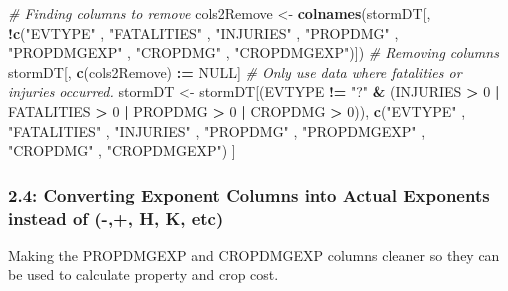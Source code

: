 \documentclass[]{article}
\newenvironment{Shaded}{\begin{snugshade}}{\end{snugshade}}
\newcommand{\KeywordTok}[1]{\textcolor[rgb]{0.13,0.29,0.53}{\textbf{#1}}}
\newcommand{\DecValTok}[1]{\textcolor[rgb]{0.00,0.00,0.81}{#1}}
\newcommand{\StringTok}[1]{\textcolor[rgb]{0.31,0.60,0.02}{#1}}
\newcommand{\CommentTok}[1]{\textcolor[rgb]{0.56,0.35,0.01}{\textit{#1}}}
\newcommand{\OtherTok}[1]{\textcolor[rgb]{0.56,0.35,0.01}{#1}}
\newcommand{\OperatorTok}[1]{\textcolor[rgb]{0.81,0.36,0.00}{\textbf{#1}}}
\newcommand{\ErrorTok}[1]{\textcolor[rgb]{0.64,0.00,0.00}{\textbf{#1}}}
\newcommand{\NormalTok}[1]{#1}
\begin{document}
\begin{Shaded}
\begin{Highlighting}[]
\CommentTok{# Finding columns to remove}
\NormalTok{cols2Remove <-}\StringTok{ }\KeywordTok{colnames}\NormalTok{(stormDT[, }\OperatorTok{!}\KeywordTok{c}\NormalTok{(}\StringTok{"EVTYPE"}
\NormalTok{  , }\StringTok{"FATALITIES"}
\NormalTok{  , }\StringTok{"INJURIES"}
\NormalTok{  , }\StringTok{"PROPDMG"}
\NormalTok{  , }\StringTok{"PROPDMGEXP"}
\NormalTok{  , }\StringTok{"CROPDMG"}
\NormalTok{  , }\StringTok{"CROPDMGEXP"}\NormalTok{)])}
\CommentTok{# Removing columns}
\NormalTok{stormDT[, }\KeywordTok{c}\NormalTok{(cols2Remove) }\OperatorTok{:}\ErrorTok{=}\StringTok{ }\OtherTok{NULL}\NormalTok{]}
\CommentTok{# Only use data where fatalities or injuries occurred.  }
\NormalTok{stormDT <-}\StringTok{ }\NormalTok{stormDT[(EVTYPE }\OperatorTok{!=}\StringTok{ "?"} \OperatorTok{&}\StringTok{ }
\StringTok{             }\NormalTok{(INJURIES }\OperatorTok{>}\StringTok{ }\DecValTok{0} \OperatorTok{|}\StringTok{ }\NormalTok{FATALITIES }\OperatorTok{>}\StringTok{ }\DecValTok{0} \OperatorTok{|}\StringTok{ }\NormalTok{PROPDMG }\OperatorTok{>}\StringTok{ }\DecValTok{0} \OperatorTok{|}\StringTok{ }\NormalTok{CROPDMG }\OperatorTok{>}\StringTok{ }\DecValTok{0}\NormalTok{)), }\KeywordTok{c}\NormalTok{(}\StringTok{"EVTYPE"}
\NormalTok{                                                                            , }\StringTok{"FATALITIES"}
\NormalTok{                                                                            , }\StringTok{"INJURIES"}
\NormalTok{                                                                            , }\StringTok{"PROPDMG"}
\NormalTok{                                                                            , }\StringTok{"PROPDMGEXP"}
\NormalTok{                                                                            , }\StringTok{"CROPDMG"}
\NormalTok{                                                                            , }\StringTok{"CROPDMGEXP"}\NormalTok{) ]}
\end{Highlighting}
\end{Shaded}

\subsubsection{2.4: Converting Exponent Columns into Actual Exponents
instead of (-,+, H, K,
etc)}\label{converting-exponent-columns-into-actual-exponents-instead-of---h-k-etc}

Making the PROPDMGEXP and CROPDMGEXP columns cleaner so they can be used
to calculate property and crop cost.
\end{document}
